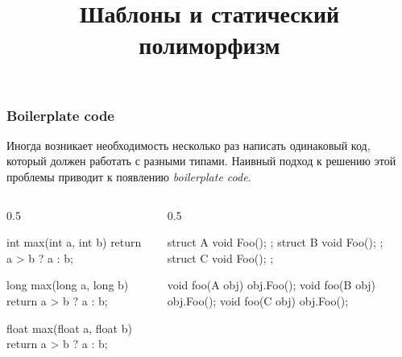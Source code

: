 \documentclass[compress, 8pt, aspectratio=169]{beamer}
\title{Шаблоны и статический полиморфизм}
\begin{document}
  \frame[plain]{\titlepage}

  \begin{frame}[fragile]

    \frametitle{Boilerplate code}

    Иногда возникает необходимость несколько раз
    написать одинаковый код, который должен работать
    с разными типами.
    Наивный подход к решению этой проблемы приводит к появлению
    \textit{boilerplate code}\footnotemark{}.


    \begin{columns}[T]
      \begin{column}{0.5\textwidth}
        \begin{myinplacelisting}[minted language=cpp]
int max(int a, int b) {
    return a > b ? a : b;
}

long max(long a, long b) {
    return a > b ? a : b;
}

float max(float a, float b) {
    return a > b ? a : b;
}
        \end{myinplacelisting}
      \end{column}
      \begin{column}{0.5\textwidth}
        \begin{myinplacelisting}[minted language=cpp]
struct A { void Foo(); };
struct B { void Foo(); };
struct C { void Foo(); };

void foo(A obj) { obj.Foo(); }
void foo(B obj) { obj.Foo(); }
void foo(C obj) { obj.Foo(); }
        \end{myinplacelisting}
      \end{column}
    \end{columns}

  \end{frame}
\end{document}

